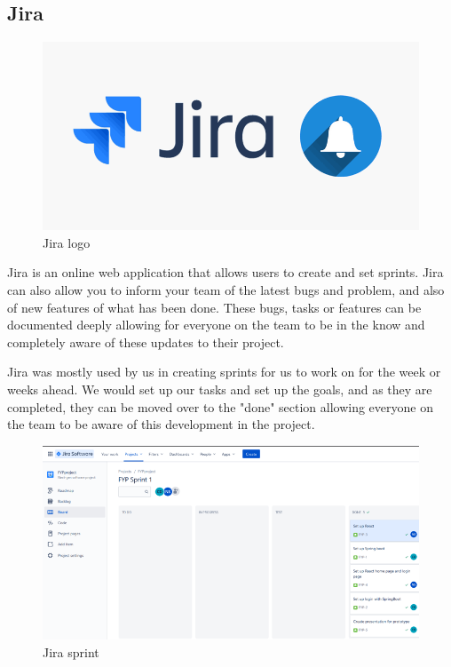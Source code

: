 \subsection{Jira}
\begin{figure}[h]
\renewcommand\thefigure{3.15}
\centering
\includegraphics[scale=0.4]{img/jira.png}
\caption{Jira logo}
\label{JiraLogo}
\end{figure}

Jira is an online web application that allows users to create and set sprints. Jira can also allow you to inform your team of the latest bugs and problem, and also of new features of what has been done. These bugs, tasks or features can be documented deeply allowing for everyone on the team to be in the know and completely aware of these updates to their project. \par
Jira was mostly used by us in creating sprints for us to work on for the week or weeks ahead. We would set up our tasks and set up the goals, and as they are completed, they can be moved over to the "done" section allowing everyone on the team to be aware of this development in the project. \par

\begin{figure}[h]
\renewcommand\thefigure{3.16}
\centering
\includegraphics[scale=0.7]{img/jira-sprint.PNG}
\caption{Jira sprint}
\label{JiraSprint}
\end{figure}


